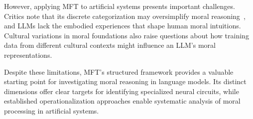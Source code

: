 \documentclass[runninghheads]{llncs}
\begin{document}
However, applying MFT to artificial systems presents important challenges. Critics note that its discrete categorization may oversimplify moral reasoning~\cite{Suhler2011}, and LLMs lack the embodied experiences that shape human moral intuitions. Cultural variations in moral foundations also raise questions about how training data from different cultural contexts might influence an LLM's moral representations.


Despite these limitations, MFT's structured framework provides a valuable starting point for investigating moral reasoning in language models. Its distinct dimensions offer clear targets for identifying specialized neural circuits, while established operationalization approaches enable systematic analysis of moral processing in artificial systems.
\end{document}
